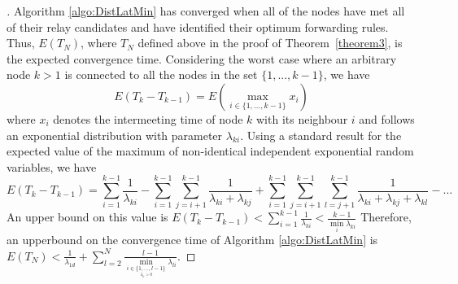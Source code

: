\documentclass[journal,onecolumn,11pt]{IEEEtran}
\theoremstyle{plain}
\theoremstyle{definition}
\begin{document}
\begin{proof}[\unskip\nopunct]
Algorithm \ref{algo:DistLatMin} has converged when all of the nodes have
met all of their relay candidates and have identified their optimum
forwarding rules. Thus, $E(T_N)$, where $T_{N}$ defined above in the proof of
Theorem~\ref{theorem3}, is the expected convergence
time. Considering the worst case where an arbitrary node $k>1$
is connected to all the nodes in the set $\{1,...,k-1\}$, we have
\begin{equation}\label{Tk}
E(T_k-T_{k-1})=E(\underset{i \in \{1,...,k-1\}}{\max} x_i)
\end{equation}
where $x_i$ denotes the intermeeting time of node $k$ with its
neighbour $i$ and follows an exponential distribution with parameter
$\lambda_{ki}$. Using a standard result for the expected value of
the maximum of non-identical independent exponential random variables, we have
\begin{equation}
E(T_k-T_{k-1})=\sum_{i=1}^{k-1} \frac{1}{\lambda_{ki}}-\sum_{i=1}^{k-1} \sum_{j=i+1}^{k-1} \frac{1}{\lambda_{ki}+\lambda_{kj}}
+ \sum_{i=1}^{k-1} \sum_{j=i+1}^{k-1}\sum_{l=j+1}^{k-1} \frac{1}{\lambda_{ki}+\lambda_{kj}+\lambda_{kl}}-\dots
\end{equation}
An upper bound on this value is
$E(T_k-T_{k-1})<\sum_{i=1}^{k-1} \frac{1}{\lambda_{ki}}<\frac{k-1}{\underset{i}{\min} \lambda_{ki}}$
Therefore, an upperbound on the convergence time of Algorithm \ref{algo:DistLatMin} is $
E(T_N)<\frac{1}{\lambda_{1d}}+\sum_{l=2}^{N} \frac{l-1}{\underset{\underset{\lambda_{li}>0}{i \in \{1,\dots,l-1\}}}{\min} \lambda_{li}}$.
\end{proof}
\end{document}
